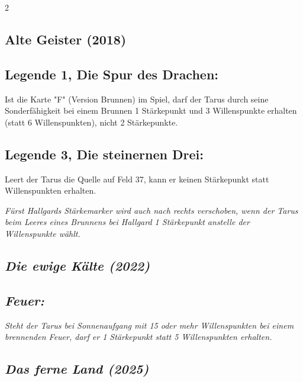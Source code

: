 \documentclass[10pt, a4paper, oneside]{book}
\newcommand{\fan}[1]{\textit{#1}}
\begin{document}
\begin{multicols*}{2}
\columnbreak


\begin{bgcolor}[color-AG]
\section{Alte Geister (2018)}


\subsection{Legende 1, Die Spur des Drachen:}

Ist die Karte "F" (Version Brunnen) im Spiel, darf der Tarus durch seine Sonderfähigkeit bei einem Brunnen 1 Stärkepunkt und 3 Willenspunkte erhalten (statt 6 Willenspunkten), nicht 2 Stärkepunkte.
\supercite{AG:Begleitheft}

\subsection{Legende 3, Die steinernen Drei:}

Leert der Tarus die Quelle auf Feld 37, kann er keinen Stärkepunkt statt Willenspunkten erhalten.
\supercite{AG:Begleitheft}

\fan{Fürst Hallgards Stärkemarker wird auch nach rechts verschoben, wenn der Tarus beim Leeres eines Brunnens bei Hallgard 1 Stärkepunkt anstelle der Willenspunkte wählt.}


\end{bgcolor}



\begin{bgcolor}
\section{\fan{Die ewige Kälte (2022)}}

\subsection{\fan{Feuer:}}

\fan{Steht der Tarus bei Sonnenaufgang mit 15 oder mehr Willenspunkten bei einem brennenden Feuer, darf er 1 Stärkepunkt statt 5 Willenspunkten erhalten. }


\end{bgcolor}


\begin{bgcolor}
\section{\fan{Das ferne Land (2025)}}


\end{bgcolor}
\end{multicols*}
\end{document}
